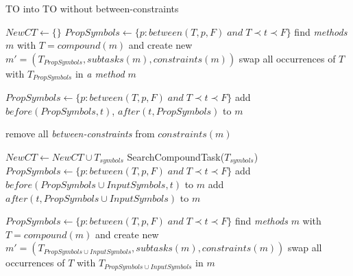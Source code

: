 \begin{algorithm}
    \caption{TO into TO without between-constraints}\label{alg04:1}
    \begin{algorithmic}[1]
            \State $NewCT \gets \{\}$ 
                    \State $PropSymbols \gets \{p: between(T, p, F) \; and \; T \prec t \prec F \}$
                        \State find \emph{methods} $m$ with $T = compound(m)$ and create new $m'=(T_{PropSymbols}, subtasks(m), constraints(m))$
                    \EndIf
                    \State swap all occurrences of $T$ with $T_{PropSymbols}$ in \emph{a method} $m$
                \EndFor

                    \State $PropSymbols \gets \{p: between(T, p, F) \; and \; T \prec t \prec F \}$
                    \State {}
                    \State add $before(PropSymbols, t)$, $after(t, PropSymbols)$ to $m$
                \EndFor
                
                \State remove all \emph{between-constraints} from $constraints(m)$

                    \State $NewCT \gets NewCT \cup T_{symbols}$
                    \State SearchCompoundTask($T_{symbols}$)
                \EndFor
            \EndWhile
        \EndProcedure
                    \State $PropSymbols \gets \{p: between(T, p, F) \; and \; T \prec t \prec F \}$
                    \State add $before(PropSymbols \cup InputSymbols, t)$ to $m$
                    \State add $after(t, PropSymbols \cup InputSymbols)$ to $m$
                \EndFor

                    \State $PropSymbols \gets \{p: between(T, p, F) \; and \; T \prec t \prec F \}$
                        \State find \emph{methods} $m$ with $T = compound(m)$ and create new $m'=(T_{PropSymbols \cup InputSymbols}, subtasks(m), constraints(m))$
                    \EndIf
                    \State swap all occurrences of $T$ with $T_{PropSymbols \cup InputSymbols}$ in $m$
                \EndFor


\end{algorithmic}
\end{algorithm}
